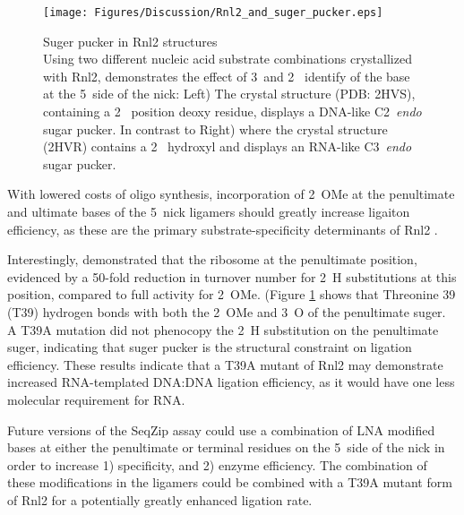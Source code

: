     \begin{figure} %
      \centering 
      \texttt{[image: Figures/Discussion/Rnl2\_and\_suger\_pucker.eps]}
      \caption[Suger pucker in Rnl2 structures]
      {Suger pucker in Rnl2 structures \\[0.25cm]
        Using two different nucleic acid substrate combinations crystallized with Rnl2, \citet{Nandakumar2006} demonstrates the effect of 3\textprime~and 2\textprime~ identify of the base at the 5\textprime~side of the nick: Left) The crystal structure (PDB: 2HVS), containing a 2\textprime~ position deoxy residue, displays a DNA-like C2\textprime~\textit{endo} sugar pucker. In contrast to Right) where the crystal structure (2HVR) contains a 2\textprime~ hydroxyl and displays an RNA-like C3\textprime~\textit{endo} sugar pucker.
        }
        \label{Disc:fig:Rnl2 and suger pucker}
        \end{figure}

    With lowered costs of oligo synthesis, incorporation of 2\textprime~OMe at the penultimate and ultimate bases of the 5\textprime~nick ligamers should greatly increase ligaiton efficiency, as these are the primary substrate-specificity determinants of Rnl2 \citep{Nandakumar2004a, Nandakumar2006}.

    Interestingly, \citet{Nandakumar2004a} demonstrated that the ribosome at the penultimate position, evidenced by a 50-fold reduction in turnover number for 2\textprime~H substitutions at this position, compared to full activity for 2\textprime~OMe. \citet{Nandakumar2006} (Figure \ref{Disc:fig:Rnl2 and suger pucker} shows that Threonine 39 (T39) hydrogen bonds with both the 2\textprime~OMe and 3\textprime~O of the penultimate suger. A T39A mutation did not phenocopy the 2\textprime~H substitution on the penultimate suger, indicating that suger pucker is the structural constraint on ligation efficiency. These results indicate that a T39A mutant of Rnl2 may demonstrate increased RNA-templated DNA:DNA ligation efficiency, as it would have one less molecular requirement for RNA.

    Future versions of the SeqZip assay could use a combination of LNA modified bases \citep{You2006} at either the penultimate or terminal residues on the 5\textprime~side of the nick in order to increase 1) specificity, and 2) enzyme efficiency. The combination of these modifications in the ligamers could be combined with a T39A mutant form of Rnl2 for a potentially greatly enhanced ligation rate.

